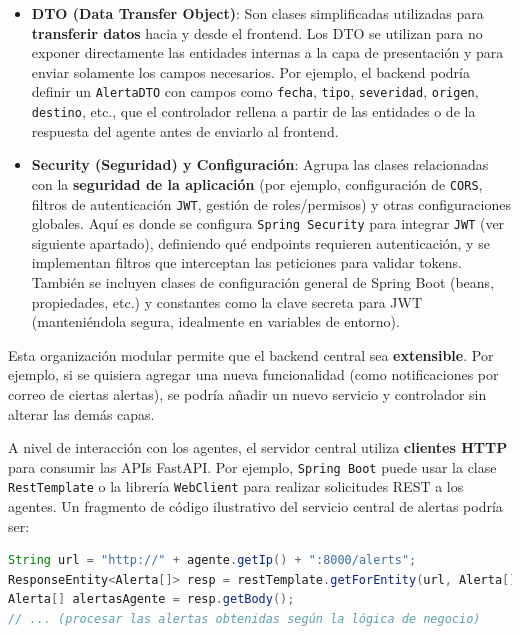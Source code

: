 \documentclass[11pt,a4paper,twoside]{report}
\begin{document}
\begin{itemize}
	\item \textbf{DTO (Data Transfer Object)}: Son clases simplificadas utilizadas para \textbf{transferir datos} hacia y desde el frontend. Los DTO se utilizan para no exponer directamente las entidades internas a la capa de presentación y para enviar solamente los campos necesarios. Por ejemplo, el backend podría definir un \texttt{AlertaDTO} con campos como \texttt{fecha}, \texttt{tipo}, \texttt{severidad}, \texttt{origen}, \texttt{destino}, etc., que el controlador rellena a partir de las entidades o de la respuesta del agente antes de enviarlo al frontend.
	
	\item \textbf{Security (Seguridad) y Configuración}: Agrupa las clases relacionadas con la \textbf{seguridad de la aplicación} (por ejemplo, configuración de \texttt{CORS}, filtros de autenticación \texttt{JWT}, gestión de roles/permisos) y otras configuraciones globales. Aquí es donde se configura \texttt{Spring Security} para integrar \texttt{JWT} (ver siguiente apartado), definiendo qué endpoints requieren autenticación, y se implementan filtros que interceptan las peticiones para validar tokens. También se incluyen clases de configuración general de Spring Boot (beans, propiedades, etc.) y constantes como la clave secreta para JWT (manteniéndola segura, idealmente en variables de entorno).
\end{itemize}

Esta organización modular permite que el backend central sea \textbf{extensible}. Por ejemplo, si se quisiera agregar una nueva funcionalidad (como notificaciones por correo de ciertas alertas), se podría añadir un nuevo servicio y controlador sin alterar las demás capas.\newline

A nivel de interacción con los agentes, el servidor central utiliza \textbf{clientes HTTP} para consumir las APIs FastAPI. Por ejemplo, \texttt{Spring Boot} puede usar la clase \texttt{RestTemplate} o la librería \texttt{WebClient} para realizar solicitudes REST a los agentes. Un fragmento de código ilustrativo del servicio central de alertas podría ser:

\begin{lstlisting}[language=Java, caption={Ejemplo simplificado de llamada desde el backend central a un agente}, label={lst:llamada-agente}]
String url = "http://" + agente.getIp() + ":8000/alerts";
ResponseEntity<Alerta[]> resp = restTemplate.getForEntity(url, Alerta[].class);
Alerta[] alertasAgente = resp.getBody();
// ... (procesar las alertas obtenidas según la lógica de negocio)
\end{lstlisting}
\end{document}
